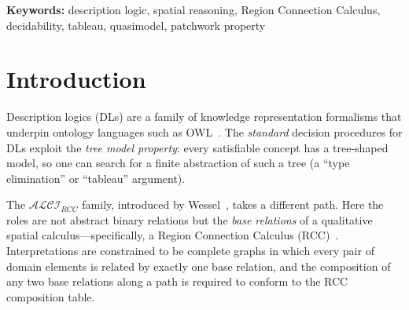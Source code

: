 \documentclass[a4paper,11pt]{article}
\theoremstyle{definition}
\newcommand{\ALCI}{\ensuremath{\mathcal{ALCI}}}
\newcommand{\ALCIRCC}[1]{\ensuremath{\mathcal{ALCI}_{\mathit{RCC#1}}}}
\newcommand{\EQ}{\ensuremath{\mathsf{EQ}}}
\newcommand{\EXPTIME}{\textsc{ExpTime}}
\newcommand{\PSPACE}{\textsc{PSpace}}
\begin{document}
\bigskip

\begin{abstract}
The description logics $\ALCIRCC{5}$ and $\ALCIRCC{8}$ extend $\ALCI$
with role boxes derived from the composition tables of the Region
Connection Calculi RCC5 and RCC8.  These logics were introduced by
Wessel~\cite{Wessel2003}, who established \PSPACE-hardness of
$\ALCIRCC{5}$ and \EXPTIME-hardness of $\ALCIRCC{8}$ but left
decidability open.  We present two procedures---a
\emph{type-elimination algorithm} and a \emph{tableau calculus with
blocking}---that exploit the \emph{patchwork property} of the RCC
calculi~\cite{RenzNebel1999} and the full tractability of the RCC5
algebra~\cite{Renz1999}.
\textbf{Erratum (April 2026):} Neither procedure establishes
decidability.  The type-elimination algorithm is
\textbf{unsound}---it rejects satisfiable concepts (see
Remark~\ref{rem:type-elim-bug}).  The (Q3) soundness proof has a gap
for singleton-multiplicity types ($\EQ \notin \mathsf{DN}$).  The
tableau calculus terminates and is complete, but its soundness proof
depends on the Henkin construction, which has an unresolved extension
gap (Remark~\ref{rem:extension-gap}).  The decidability of
$\ALCIRCC{5}$ and $\ALCIRCC{8}$ remains \textbf{genuinely open}.
\end{abstract}

\medskip
\noindent\textbf{Keywords:} description logic, spatial reasoning,
Region Connection Calculus, decidability, tableau, quasimodel,
patchwork property

\section{Introduction}
\label{sec:intro}

Description logics (DLs) are a family of knowledge representation
formalisms that underpin ontology languages such as
OWL~\cite{BaaderEtAl2003}.  The \emph{standard} decision procedures
for DLs exploit the \emph{tree model property}: every satisfiable
concept has a tree-shaped model, so one can search for a finite
abstraction of such a tree (a ``type elimination'' or ``tableau''
argument).

The $\ALCIRCC{}$ family, introduced by
Wessel~\cite{Wessel2003,Wessel2000}, takes a different path.  Here the
roles are not abstract binary relations but the \emph{base relations}
of a qualitative spatial calculus---specifically, a Region Connection
Calculus (RCC)~\cite{RandellEtAl1992}.  Interpretations are
constrained to be complete graphs in which every pair of domain
elements is related by exactly one base relation, and the composition
of any two base relations along a path is required to conform to the
RCC composition table.
\end{document}
